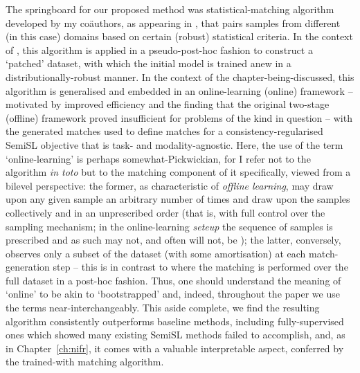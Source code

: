 The springboard for our proposed method was statistical-matching algorithm developed by my
co{\"a}uthors, as appearing in \citet{RomInsShaQua22}, that pairs samples from different (in this
case) domains based on certain (robust) statistical criteria. 
%
In the context of \citet{RomInsShaQua22}, this algorithm is applied in a pseudo-post-hoc fashion to
construct a `patched' dataset, with which the initial model is trained anew in a
distributionally-robust manner.
%
In the context of the chapter-being-discussed, this algorithm is generalised and embedded in an
online-learning (online) framework -- motivated by improved efficiency and the finding that the
original two-stage (offline) framework proved insufficient for problems of the kind in question --
with the generated matches used to define matches for a consistency-regularised \ac{SemiSL}
objective that is task- and modality-agnostic.
%
Here, the use of the term `online-learning' is perhaps somewhat-Pickwickian, for I refer not to the
algorithm \emph{in toto} but to the matching component of it specifically, viewed from a bilevel
perspective: the former, as characteristic of \emph{offline learning}, may draw upon any given
sample an arbitrary number of times and draw upon the samples collectively and in an unprescribed
order (that is, with full control over the sampling mechanism; in the online-learning \emph{seteup}
the sequence of samples is prescribed and as such may not, and often will not, be \iid{}); the
latter, conversely, observes only a subset of the dataset (with some amortisation) at each
match-generation step -- this is in contrast to \citet{RomInsShaQua22} where the matching is
performed over the full dataset in a post-hoc fashion.
%
Thus, one should understand the meaning of `online' to be akin to `bootstrapped' and, indeed,
throughout the paper we use the terms near-interchangeably.
%
This aside complete, we find the resulting algorithm consistently outperforms baseline methods,
including fully-supervised ones which \citet{SagWeiLeeGaoetal22} showed many existing \ac{SemiSL}
methods failed to accomplish, and, as in Chapter~\ref{ch:nifr}, it comes with a valuable
interpretable aspect, conferred by the trained-with matching algorithm.
%
